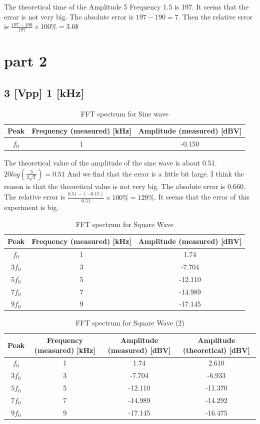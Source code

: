 \documentclass{article}
\begin{document}
The theoretical time of the Amplitude 5 Frequency 1.5 is 197. It seems that the error is not very big. The absolute error is $197-190=7$. Then the relative error is $\frac{197-190}{197}\times 100\%=3.6\$$
\section{part 2}
\subsection{3 [Vpp] 1 [kHz]}
\begin{table}[H]
	\centering
	\begin{tabular}{|c|c|c|}
		\hline 
		Peak& Frequency (measured) [kHz] & Amplitude (measured) [dBV] \\ 
		\hline 
		$f_0$&1  & -0.150 \\ 
		\hline 
	\end{tabular} 
\caption{FFT spectrum for Sine wave}
\end{table}
The theoretical value of the amplitude of the sine wave is about 0.51. $20log(\frac{3}{2\sqrt{2}})=0.51$ And we find that the error is a little bit large. I think the reason is that the theoretical value is not very big. The absolute error is 0.660. The relative error is $\frac{0.51-(-0.15)}{0.51}\times 100\%=129\%$. It seems that the error of this experiment is big.
\begin{table}[H]
	\centering
	\begin{tabular}{|c|c|c|}
		\hline 
		Peak& Frequency (measured) [kHz] & Amplitude (measured) [dBV] \\ 
		\hline 
		$f_0$& 1 & 1.74 \\ 
		\hline 
		$3f_0$& 3 & -7.704 \\ 
		\hline 
		$5f_0$& 5 & -12.110 \\ 
		\hline 
		$7f_0$& 7 & -14.989 \\ 
		\hline 
		$9f_0$& 9 & -17.145 \\ 
		\hline 
	\end{tabular} 
\caption{FFT spectrum for Square Wave}
\end{table}
\begin{table}[H]
	\centering
	\begin{tabular}{|c|c|c|c|}
		\hline 
		Peak& Frequency (measured) [kHz] & Amplitude (measured) [dBV] &Amplitude (theoretical) [dBV]\\ 
		\hline 
		$f_0$& 1 & 1.74 &2.610\\ 
		\hline 
		$3f_0$& 3 & -7.704&-6.933 \\ 
		\hline 
		$5f_0$& 5 & -12.110&-11.370 \\ 
		\hline 
		$7f_0$& 7 & -14.989&-14.292\\ 
		\hline 
		$9f_0$& 9 & -17.145 &-16.475\\ 
		\hline 
	\end{tabular} 
	\caption{FFT spectrum for Square Wave (2)}
\end{table}
\end{document}
